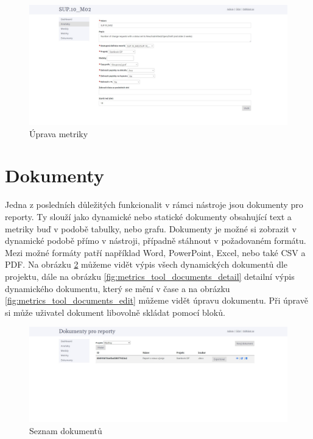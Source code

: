 \documentclass[czech,master]{diploma}
\begin{document}
\begin{figure}[!ht]
    \centering
    \includegraphics[width=1\textwidth]{Diplomka/Figures/metrics_tool/metrics_edit.jpg}
    \caption{Úprava metriky}
    \label{fig:metrics_tool_metrics_edit}
\end{figure}
\section{Dokumenty}
Jedna z posledních důležitých funkcionalit v rámci nástroje jsou dokumenty pro reporty. Ty slouží jako dynamické nebo statické dokumenty obsahující text a metriky buď v podobě tabulky, nebo grafu. Dokumenty je možné si zobrazit v dynamické podobě přímo v nástroji, případně stáhnout v požadovaném formátu. Mezi možné formáty patří například Word, PowerPoint, Excel, nebo také CSV a PDF. Na obrázku \ref{fig:metrics_tool_documents} můžeme vidět výpis všech dynamických dokumentů dle projektu, dále na obrázku \ref{fig:metrics_tool_documents_detail} detailní výpis dynamického dokumentu, který se mění v čase a na obrázku \ref{fig:metrics_tool_documents_edit} můžeme vidět úpravu dokumentu. Při úpravě si může uživatel dokument libovolně skládat pomocí bloků. 

\begin{figure}[!ht]
    \centering
    \includegraphics[width=1\textwidth]{Diplomka/Figures/metrics_tool/documents.jpg}
    \caption{Seznam dokumentů}
    \label{fig:metrics_tool_documents}
\end{figure}
\end{document}
